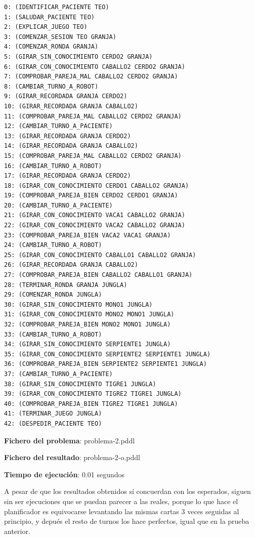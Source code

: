 \documentclass{uc3mpracticas}
\begin{document}
    \begin{lstlisting}
0: (IDENTIFICAR_PACIENTE TEO)
1: (SALUDAR_PACIENTE TEO)
2: (EXPLICAR_JUEGO TEO)
3: (COMENZAR_SESION TEO GRANJA)
4: (COMENZAR_RONDA GRANJA)
5: (GIRAR_SIN_CONOCIMIENTO CERDO2 GRANJA)
6: (GIRAR_CON_CONOCIMIENTO CABALLO2 CERDO2 GRANJA)
7: (COMPROBAR_PAREJA_MAL CABALLO2 CERDO2 GRANJA)
8: (CAMBIAR_TURNO_A_ROBOT)
9: (GIRAR_RECORDADA GRANJA CERDO2)
10: (GIRAR_RECORDADA GRANJA CABALLO2)
11: (COMPROBAR_PAREJA_MAL CABALLO2 CERDO2 GRANJA)
12: (CAMBIAR_TURNO_A_PACIENTE)
13: (GIRAR_RECORDADA GRANJA CERDO2)
14: (GIRAR_RECORDADA GRANJA CABALLO2)
15: (COMPROBAR_PAREJA_MAL CABALLO2 CERDO2 GRANJA)
16: (CAMBIAR_TURNO_A_ROBOT)
17: (GIRAR_RECORDADA GRANJA CERDO2)
18: (GIRAR_CON_CONOCIMIENTO CERDO1 CABALLO2 GRANJA)
19: (COMPROBAR_PAREJA_BIEN CERDO2 CERDO1 GRANJA)
20: (CAMBIAR_TURNO_A_PACIENTE)
21: (GIRAR_CON_CONOCIMIENTO VACA1 CABALLO2 GRANJA)
22: (GIRAR_CON_CONOCIMIENTO VACA2 CABALLO2 GRANJA)
23: (COMPROBAR_PAREJA_BIEN VACA2 VACA1 GRANJA)
24: (CAMBIAR_TURNO_A_ROBOT)
25: (GIRAR_CON_CONOCIMIENTO CABALLO1 CABALLO2 GRANJA)
26: (GIRAR_RECORDADA GRANJA CABALLO2)
27: (COMPROBAR_PAREJA_BIEN CABALLO2 CABALLO1 GRANJA)
28: (TERMINAR_RONDA GRANJA JUNGLA)
29: (COMENZAR_RONDA JUNGLA)
30: (GIRAR_SIN_CONOCIMIENTO MONO1 JUNGLA)
31: (GIRAR_CON_CONOCIMIENTO MONO2 MONO1 JUNGLA)
32: (COMPROBAR_PAREJA_BIEN MONO2 MONO1 JUNGLA)
33: (CAMBIAR_TURNO_A_ROBOT)
34: (GIRAR_SIN_CONOCIMIENTO SERPIENTE1 JUNGLA)
35: (GIRAR_CON_CONOCIMIENTO SERPIENTE2 SERPIENTE1 JUNGLA)
36: (COMPROBAR_PAREJA_BIEN SERPIENTE2 SERPIENTE1 JUNGLA)
37: (CAMBIAR_TURNO_A_PACIENTE)
38: (GIRAR_SIN_CONOCIMIENTO TIGRE1 JUNGLA)
39: (GIRAR_CON_CONOCIMIENTO TIGRE2 TIGRE1 JUNGLA)
40: (COMPROBAR_PAREJA_BIEN TIGRE2 TIGRE1 JUNGLA)
41: (TERMINAR_JUEGO JUNGLA)
42: (DESPEDIR_PACIENTE TEO)
    \end{lstlisting}

  \vspace{2mm}

    \textbf{Fichero del problema}: problema-2.pddl

    \textbf{Fichero del resultado}: problema-2-o.pddl

    \textbf{Tiempo de ejecución}: 0.01 segundos

  \vspace{3mm}

  A pesar de que los resultados obtenidos sí concuerdan con los esperados, siguen sin ser ejecuciones que se puedan parecer a las reales, porque lo que hace el planificador es equivocarse levantando las mismas cartas 3 veces seguidas al principio, y depués el resto de turnos los hace perfectos, igual que en la prueba anterior.
\end{document}
